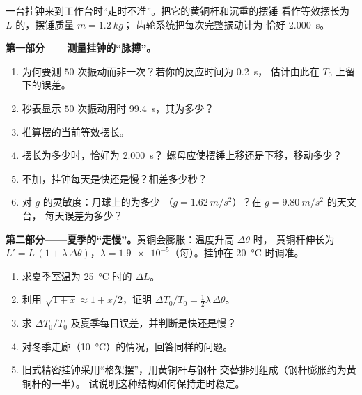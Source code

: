 \begin{problem}
\label{pb:g12:oscillators-and-time:1}
一台挂钟来到工作台时“走时不准”。把它的黄铜杆和沉重的摆锤
看作等效摆长为 $L$ 的，摆锤质量 $m = \qty{1.2}{kg}$；
齿轮系统把每次完整振动计为
恰好 \qty{2.000}{s}。

\medskip
\noindent\textbf{第一部分——测量挂钟的“脉搏”。}
\begin{enumerate}
  \item 为何要测 $50$ 次振动而非一次？若你的反应时间为 \qty{0.2}{s}，
        估计由此在 $T_0$ 上留下的误差。
  \item 秒表显示 $50$ 次振动用时 \qty{99.4}{s}，其为多少？
  \item 推算摆的当前等效摆长。
  \item 摆长为多少时，恰好为 \qty{2.000}{s}？
        螺母应使摆锤上移还是下移，移动多少？
  \item 不加，挂钟每天是快还是慢？相差多少秒？
  \item 对 $g$ 的灵敏度：月球上的为多少
        （$g = \qty{1.62}{m/s^2}$）？在 $g = \qty{9.80}{m/s^2}$ 的天文台，
        每天误差为多少？
\end{enumerate}

\medskip
\noindent\textbf{第二部分——夏季的“走慢”。}黄铜会膨胀：温度升高 $\Delta\theta$ 时，
黄铜杆伸长为 $L' = L\,(1 + \lambda\,
\Delta\theta)$，$\lambda = \num{1.9e-5}$（每）。挂钟在
\qty{20}{\celsius} 时调准。
\begin{enumerate}[resume]
  \item 求夏季室温为 \qty{25}{\celsius} 时的 $\Delta L$。
  \item 利用 $\sqrt{1+x} \approx 1 + x/2$，证明
        $\Delta T_0 / T_0 = \tfrac12 \lambda\, \Delta\theta$。
  \item 求 $\Delta T_0/T_0$ 及夏季每日误差，并判断是快还是慢？
  \item 对冬季走廊（\qty{10}{\celsius}）的情况，回答同样的问题。
  \item 旧式精密挂钟采用“格架摆”，用黄铜杆与钢杆
        交替排列组成（钢杆膨胀约为黄铜杆的一半）。
        试说明这种结构如何保持走时稳定。
\end{enumerate}


\end{problem}

